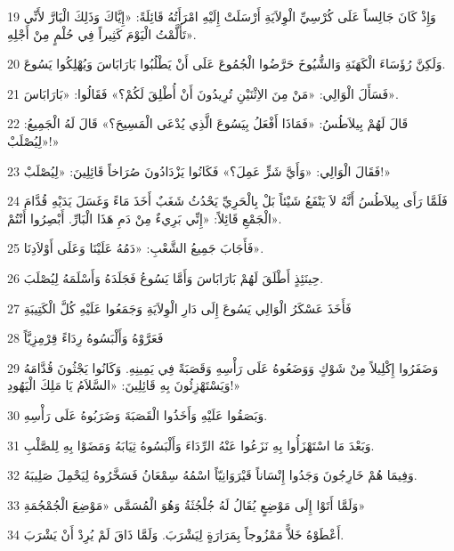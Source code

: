 \par 19 وَإِذْ كَانَ جَالِساً عَلَى كُرْسِيِّ الْوِلاَيَةِ أَرْسَلَتْ إِلَيْهِ امْرَأَتُهُ قَائِلَةً: «إِيَّاكَ وَذَلِكَ الْبَارَّ لأَنِّي تَأَلَّمْتُ الْيَوْمَ كَثِيراً فِي حُلْمٍ مِنْ أَجْلِهِ».
\par 20 وَلَكِنَّ رُؤَسَاءَ الْكَهَنَةِ وَالشُّيُوخَ حَرَّضُوا الْجُمُوعَ عَلَى أَنْ يَطْلُبُوا بَارَابَاسَ وَيُهْلِكُوا يَسُوعَ.
\par 21 فَسَأَلَ الْوَالِي: «مَنْ مِنَ الاِثْنَيْنِ تُرِيدُونَ أَنْ أُطْلِقَ لَكُمْ؟» فَقَالُوا: «بَارَابَاسَ».
\par 22 قَالَ لَهُمْ بِيلاَطُسُ: «فَمَاذَا أَفْعَلُ بِيَسُوعَ الَّذِي يُدْعَى الْمَسِيحَ؟» قَالَ لَهُ الْجَمِيعُ: «لِيُصْلَبْ!»
\par 23 فَقَالَ الْوَالِي: «وَأَيَّ شَرٍّ عَمِلَ؟» فَكَانُوا يَزْدَادُونَ صُرَاخاً قَائِلِينَ: «لِيُصْلَبْ!»
\par 24 فَلَمَّا رَأَى بِيلاَطُسُ أَنَّهُ لاَ يَنْفَعُ شَيْئاً بَلْ بِالْحَرِيِّ يَحْدُثُ شَغَبٌ أَخَذَ مَاءً وَغَسَلَ يَدَيْهِ قُدَّامَ الْجَمْعِ قَائِلاً: «إِنِّي بَرِيءٌ مِنْ دَمِ هَذَا الْبَارِّ. أَبْصِرُوا أَنْتُمْ».
\par 25 فَأَجَابَ جَمِيعُ الشَّعْبِ: «دَمُهُ عَلَيْنَا وَعَلَى أَوْلاَدِنَا».
\par 26 حِينَئِذٍ أَطْلَقَ لَهُمْ بَارَابَاسَ وَأَمَّا يَسُوعُ فَجَلَدَهُ وَأَسْلَمَهُ لِيُصْلَبَ.
\par 27 فَأَخَذَ عَسْكَرُ الْوَالِي يَسُوعَ إِلَى دَارِ الْوِلاَيَةِ وَجَمَعُوا عَلَيْهِ كُلَّ الْكَتِيبَةِ
\par 28 فَعَرَّوْهُ وَأَلْبَسُوهُ رِدَاءً قِرْمِزِيَّاً
\par 29 وَضَفَرُوا إِكْلِيلاً مِنْ شَوْكٍ وَوَضَعُوهُ عَلَى رَأْسِهِ وَقَصَبَةً فِي يَمِينِهِ. وَكَانُوا يَجْثُونَ قُدَّامَهُ وَيَسْتَهْزِئُونَ بِهِ قَائِلِينَ: «السَّلاَمُ يَا مَلِكَ الْيَهُودِ!»
\par 30 وَبَصَقُوا عَلَيْهِ وَأَخَذُوا الْقَصَبَةَ وَضَرَبُوهُ عَلَى رَأْسِهِ.
\par 31 وَبَعْدَ مَا اسْتَهْزَأُوا بِهِ نَزَعُوا عَنْهُ الرِّدَاءَ وَأَلْبَسُوهُ ثِيَابَهُ وَمَضَوْا بِهِ لِلصَّلْبِ.
\par 32 وَفِيمَا هُمْ خَارِجُونَ وَجَدُوا إِنْسَاناً قَيْرَوَانِيّاً اسْمُهُ سِمْعَانُ فَسَخَّرُوهُ لِيَحْمِلَ صَلِيبَهُ.
\par 33 وَلَمَّا أَتَوْا إِلَى مَوْضِعٍ يُقَالُ لَهُ جُلْجُثَةُ وَهُوَ الْمُسَمَّى «مَوْضِعَ الْجُمْجُمَةِ»
\par 34 أَعْطَوْهُ خَلاًّ مَمْزُوجاً بِمَرَارَةٍ لِيَشْرَبَ. وَلَمَّا ذَاقَ لَمْ يُرِدْ أَنْ يَشْرَبَ.
